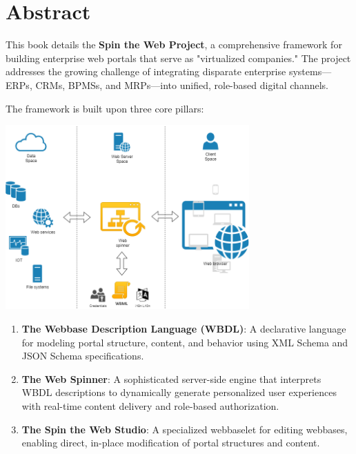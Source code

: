 
\chapter*{Abstract}

This book details the \textbf{Spin the Web Project}, a comprehensive framework for building enterprise web portals that serve as "virtualized companies." The project addresses the growing challenge of integrating disparate enterprise systems—ERPs, CRMs, BPMSs, and MRPs—into unified, role-based digital channels.

The framework is built upon three core pillars:

\begin{center}
\includegraphics[width=0.7\textwidth]{figures/spin-the-web-pillars.png}\\[0.5cm]
\end{center}

\begin{enumerate}
\item \textbf{The Webbase Description Language (WBDL)}: A declarative language for modeling portal structure, content, and behavior using XML Schema and JSON Schema specifications.

\item \textbf{The Web Spinner}: A sophisticated server-side engine that interprets WBDL descriptions to dynamically generate personalized user experiences with real-time content delivery and role-based authorization.

\item \textbf{The Spin the Web Studio}: A specialized webbaselet for editing webbases, enabling direct, in-place modification of portal structures and content.
\end{enumerate}

